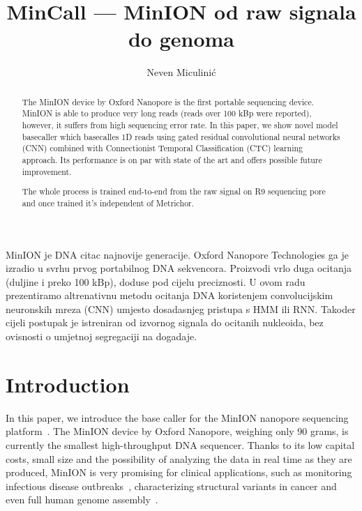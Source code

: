 \documentclass[times, utf8, seminar, numeric]{fer}
\begin{document}
\theoremstyle{definition}
\newtheorem{definition}{Definition}[section]

\title{MinCall --- MinION od raw signala do genoma}
\author{Neven Miculinić}

\maketitle
\tableofcontents

\begin{sazetak}
MinION je DNA citac najnovije generacije. Oxford Nanopore Technologies ga je izradio u svrhu prvog portabilnog DNA sekvencora. Proizvodi vrlo duga ocitanja (duljine i preko 100 kBp), doduse pod cijelu preciznosti. U ovom radu prezentiramo altrenativnu metodu ocitanja DNA koristenjem convolucijskim neuronskih mreza (CNN) umjesto dosadasnjeg pristupa s HMM ili RNN. Takoder cijeli postupak je istreniran od izvornog signala do ocitanih nukleoida, bez ovisnosti o umjetnoj segregaciji na dogadaje.

\end{sazetak}

\begin{abstract}
    The MinION device by Oxford Nanopore is the first portable sequencing device. MinION is able to produce very long reads (reads over 100 kBp were reported), however, it suffers from high sequencing error rate. In this paper, we show novel model basecaller which basecalles 1D reads using gated residual convolutional neural networks (CNN) combined with Connectionist Temporal Classification (CTC) learning approach. Its performance is on par with state of the art and offers possible future improvement.

    The whole process is trained end-to-end from the raw signal on R9 sequencing pore and once trained it's independent of Metrichor.
\end{abstract}

\chapter{Introduction}

In this paper, we introduce the base caller for the MinION nanopore sequencing platform~\cite{mikheyev2014first}. The MinION device by Oxford Nanopore, weighing only 90 grams, is currently the smallest high-throughput DNA sequencer. Thanks to its low capital costs, small size and the possibility of analyzing the data in real time as they are produced, MinION is very promising for clinical applications, such as monitoring infectious disease outbreaks~\cite{judge2015early}\cite{quick2016real}, characterizing structural variants in cancer\cite{norris2016nanopore} and even full human genome assembly~\cite{jain2017nanopore}.
\end{document}
